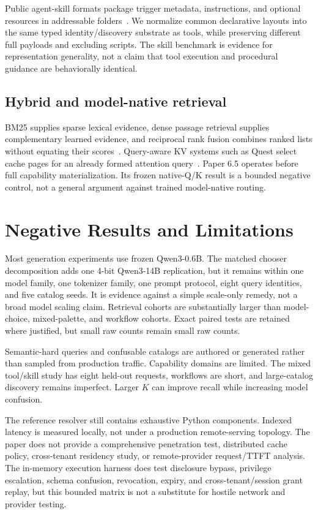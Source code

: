 \documentclass[11pt]{article}
\begin{document}
Public agent-skill formats package trigger metadata, instructions, and optional
resources in addressable folders~\cite{anthropic2026skills}. We normalize
common declarative layouts into the same typed identity/discovery substrate as
tools, while preserving different full payloads and excluding scripts. The
skill benchmark is evidence for representation generality, not a claim that
tool execution and procedural guidance are behaviorally identical.

\subsection{Hybrid and model-native retrieval}

BM25 supplies sparse lexical evidence, dense passage retrieval supplies
complementary learned evidence, and reciprocal rank fusion combines ranked
lists without equating their scores~\cite{robertson2009bm25,karpukhin2020dpr,
cormack2009rrf}. Query-aware KV systems such as Quest select cache pages for an
already formed attention query~\cite{tang2024quest}. Paper 6.5 operates before
full capability materialization. Its frozen native-Q/K result is a bounded
negative control, not a general argument against trained model-native routing.

\section{Negative Results and Limitations}

Most generation experiments use frozen Qwen3-0.6B. The matched chooser
decomposition adds one 4-bit Qwen3-14B replication, but it remains within one
model family, one tokenizer family, one prompt protocol, eight query identities,
and five catalog seeds. It is evidence against a simple scale-only remedy, not
a broad model scaling claim. Retrieval cohorts are substantially larger than
model-choice, mixed-palette, and workflow cohorts. Exact paired tests are
retained where justified, but small raw counts remain small raw counts.

Semantic-hard queries and confusable catalogs are authored or generated rather
than sampled from production traffic. Capability domains are limited. The
mixed tool/skill study has eight held-out requests, workflows are short, and
large-catalog discovery remains imperfect. Larger $K$ can improve recall while
increasing model confusion.

The reference resolver still contains exhaustive Python components. Indexed
latency is measured locally, not under a production remote-serving topology.
The paper does not provide a comprehensive penetration test, distributed cache
policy, cross-tenant residency study, or remote-provider request/TTFT analysis.
The in-memory execution harness does test disclosure bypass, privilege
escalation, schema confusion, revocation, expiry, and cross-tenant/session
grant replay, but this bounded matrix is not a substitute for hostile network
and provider testing.
\end{document}
